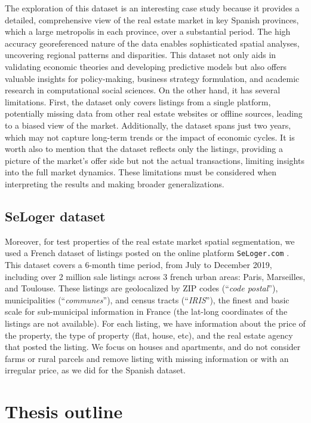 The exploration of this dataset is an interesting case study because it provides a detailed, comprehensive view of the real estate market in key Spanish provinces, which a large metropolis in each province, over a substantial period. The high accuracy georeferenced nature of the data enables sophisticated spatial analyses, uncovering regional patterns and disparities. This dataset not only aids in validating economic theories and developing predictive models but also offers valuable insights for policy-making, business strategy formulation, and academic research in computational social sciences. On the other hand, it has several limitations. First, the dataset only covers listings from a single platform, potentially missing data from other real estate websites or offline sources, leading to a biased view of the market. Additionally, the dataset spans just two years, which may not capture long-term trends or the impact of economic cycles. It is worth also to mention that the dataset reflects only the listings, providing a picture of the market's offer side but not the actual transactions, limiting insights into the full market dynamics. These limitations must be considered when interpreting the results and making broader generalizations.

\subsection{\label{subsec:SeLoger dataset} SeLoger dataset}

Moreover, for test properties of the real estate market spatial segmentation, we used a French dataset of listings posted on the online platform \texttt{SeLoger.com} \cite{SeLoger}. This dataset covers a 6-month time period, from July to December 2019, including over 2 million sale listings across 3 french urban areas: Paris, Marseilles, and Toulouse. These listings are geolocalized by ZIP codes (``\textit{code postal}''), municipalities (``\textit{communes}''), and census tracts (``\textit{IRIS}''), the finest and basic scale for sub-municipal information in France (the lat-long coordinates of the listings are not available). For each listing, we have information about the price of the property, the type of property (flat, house, etc), and the real estate agency that posted the listing. We focus on houses and apartments, and do not consider farms or rural parcels and remove listing with missing information or with an irregular price, as we did for the Spanish dataset.

\section{\label{sec:Thesis outline} Thesis outline}

